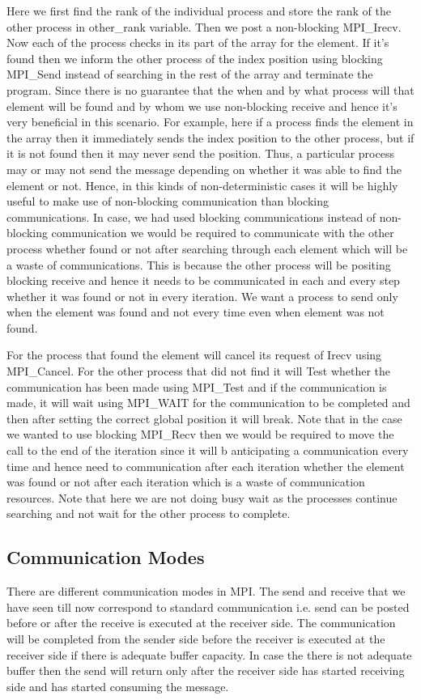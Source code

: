 \documentclass[12pt]{book}
\begin{document}
Here we first find the rank of the individual process and store the rank of the other process in other\_rank variable. Then we post a non-blocking MPI\_Irecv. Now each of the process checks in its part of the array for the element. If it's found then we inform the other process of the index position using blocking MPI\_Send instead of searching in the rest of the array and terminate the program. Since there is no guarantee that the when and by what process will that element will be found and by whom we use non-blocking receive and hence it's very beneficial in this scenario. For example, here if a process finds the element in the array then it immediately sends the index position to the other process, but if it is not found then it may never send the position. Thus, a particular process may or may not send the message depending on whether it was able to find the element or not. Hence, in this kinds of non-deterministic cases it will be highly useful to make use of non-blocking communication than blocking communications. In case, we had used blocking communications instead of non-blocking communication we would be required to communicate with the other process whether found or not after searching through each element which will be a waste of communications. This is because the other process will be positing blocking receive and hence it needs to be communicated in each and every step whether it was found or not in every iteration. We want a process to send only when the element was found and not every time even when element was not found.

For the process that found the element will cancel its request of Irecv using MPI\_Cancel. For the other process that did not find it will Test whether the communication has been made using MPI\_Test and if the communication is made, it will wait using MPI\_WAIT for the communication to be completed and then after setting the correct global position it will break. Note that in the case we wanted to use blocking MPI\_Recv then we would be required to move the call to the end of the iteration since it will b anticipating a communication every time and hence need to communication after each iteration whether the element was found or not after each iteration which is a waste of communication resources. Note that here we are not doing busy wait as the processes continue searching and not wait for the other process to complete.

\subsection{Communication Modes}
There are different communication modes in MPI. The send and receive that we have seen till now correspond to standard communication i.e. send can be posted before or after the receive is executed at the receiver side. The communication will be completed from the sender side before the receiver is executed at the receiver side if there is adequate buffer capacity. In case the there is not adequate buffer then the send will return only after the receiver side has started receiving side and has started consuming the message. 
\end{document}
